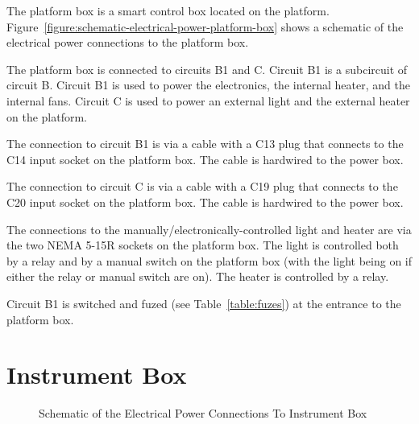 The platform box is a smart control box located on the platform. Figure~\ref{figure:schematic-electrical-power-platform-box} shows a schematic of the electrical power connections to the platform box.


The platform box is connected to circuits B1 and C. Circuit B1 is a subcircuit of circuit B. Circuit B1 is used to power the electronics, the internal heater, and the internal fans. Circuit C is used to power an external light and the external heater on the platform.

The connection to circuit B1 is via a cable with a C13 plug that connects to the C14 input socket on the platform box. The cable is hardwired to the power box.

The connection to circuit C is via a cable with a C19 plug that connects to the C20 input socket on the platform box. The cable is hardwired to the power box.

The connections to the manually/electronically-controlled light and heater are via the two NEMA 5-15R sockets on the platform box. The light is controlled both by a relay and by a manual switch on the platform box (with the light being on if either the relay or manual switch are on). The heater is controlled by a relay.

Circuit B1 is switched and fuzed (see Table~\ref{table:fuzes}) at the entrance to the platform box.

\ifcoatlioan

\section{Instrument Box}

\begin{figure}
\begin{center}
\footnotesize 
{}
\end{center}
\caption{Schematic of the Electrical Power Connections To Instrument Box}
\label{figure:schematic-electrical-power-instrument-box}
\end{figure}

